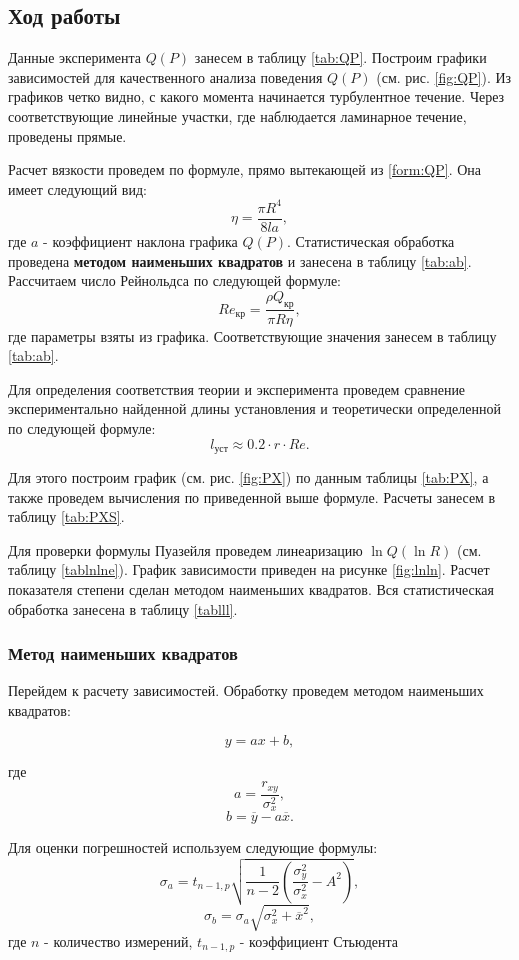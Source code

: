 \documentclass[12pt,a4paper]{article}
\begin{document}
\subsection*{Ход работы}



Данные эксперимента $Q(P)$ занесем в таблицу \ref{tab:QP}. Построим графики зависимостей для качественного анализа поведения $Q(P)$ (см. рис. \ref{fig:QP}).
Из графиков четко видно, с какого момента начинается турбулентное течение. Через соответствующие линейные участки, где наблюдается ламинарное течение, проведены прямые.

Расчет вязкости проведем по формуле, прямо вытекающей из \ref{form:QP}. Она имеет следующий вид:
$$\eta = \frac{\pi R^4}{8la},$$
где $a$ - коэффициент наклона графика $Q(P)$.
Статистическая обработка проведена \textbf{методом наименьших квадратов} и занесена в таблицу \ref{tab:ab}.
Рассчитаем число Рейнольдса по следующей формуле:
$$Re_{\text{кр}} = \frac{\rho Q_{\text{кр}}}{\pi R \eta},$$
где параметры взяты из графика. Соответствующие значения занесем в таблицу \ref{tab:ab}.

Для определения соответствия теории и эксперимента проведем сравнение экспериментально найденной длины установления и теоретически определенной по следующей формуле:
$$l_{\text{уст}} \approx  0.2 \cdot r \cdot Re.$$

Для этого построим график (см. рис. \ref{fig:PX}) по данным таблицы \ref{tab:PX}, а также проведем вычисления по приведенной выше формуле. Расчеты занесем в таблицу \ref{tab:PXS}.

Для проверки формулы Пуазейля проведем линеаризацию $\ln{Q} (\ln{R})$ (см. таблицу \ref{tablnlne}). График зависимости приведен на рисунке \ref{fig:lnln}. Расчет показателя степени сделан методом наименьших квадратов. Вся статистическая обработка занесена в таблицу \ref{tablll}.

\subsubsection*{Метод наименьших квадратов}
Перейдем к расчету зависимостей. Обработку проведем методом наименьших квадратов:

$$y = ax + b,$$

где $$a = \frac{r_{xy}}{ \sigma_x^2},$$
$$b = \overline{y} - a\overline{x}.$$

Для оценки погрешностей используем следующие формулы:
$$\sigma_a =  t_{n-1, p} \sqrt{\frac{1}{n-2} \left( \frac{\sigma_y^2}{\sigma_x^2} - A^2 \right)},$$
$$\sigma_b = \sigma_a \sqrt{\sigma_x^2 + \overline{x}^2},$$
где 
$n$ - количество измерений, $ t_{n-1, p}$ - коэффициент Стьюдента
\end{document}
